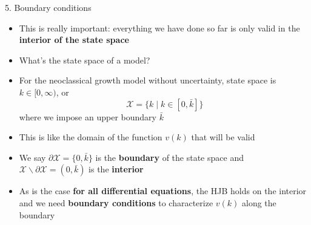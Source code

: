 \documentclass[10pt]{beamer}
\begin{document}
\begin{frame}{5. Boundary conditions}
\begin{itemize}
\item This is really important: everything we have done so far is only valid in the \textbf{interior of the state space}

\item What's the state space of a model? 

\item For the neoclassical growth model without uncertainty, state space is $k \in [0, \infty)$, or 
\begin{equation*}
	\mathcal X = \Big\{ k \mid k \in [0, \bar k] \Big\}
\end{equation*}
where we impose an upper boundary $\bar k$ 

\item This is like the domain of the function $v(k)$ that will be valid 

\item We say $\partial \mathcal X = \{ 0, \bar k \}$ is the \textbf{boundary} of the state space and $\mathcal X \backslash \partial \mathcal X = (0, \bar k)$ is the \textbf{interior}

\item As is the case \textbf{for all differential equations}, the HJB holds on the interior and we need \textbf{boundary conditions} to characterize $v(k)$ along the boundary 
\end{itemize}
\end{frame}
\end{document}
